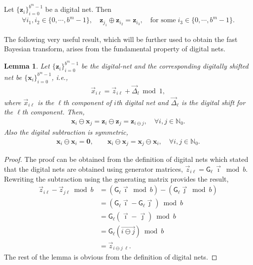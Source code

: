 \documentclass{iitthesis}          %
\newcommand{\bm}[1]{\boldsymbol{#1}}
\newcommand{\naturals}{\mathbb{N}}
\newcommand{\vx}{\bm{x}}
\newcommand{\vz}{\bm{z}}
\newcommand{\mG}{\mathsf{G}}
\newtheorem{lemma}[theorem]{Lemma}
\begin{document}
Let $\{\vz_i\}_{i=0}^{b^m-1}$ be a digital net. Then
\begin{align*}
\forall i_1, i_2 \in \{0,\cdots,b^m-1\}, \quad \vz_{j_1} \oplus \vz_{i_2} = \vz_{i_3}, \quad \text{for some} \; i_3 \in \{0,\cdots,b^m-1\}.
\end{align*}

The following very useful result, which will be further used to obtain the fast Bayesian transform, arises from the fundamental property of digital nets.

\begin{lemma}
\label{lemma:digital_net_prop}
Let $\{\vz_i\}_{i=0}^{b^{m}-1}$ be the digital-net and the corresponding digitally shifted net be $\{\vx_i\}_{i=0}^{b^{m}-1}$, i.e.,
\begin{align*}
\vec{x}_{i \ell} = \vec{z}_{i \ell} + \vec{\Delta}_l \bmod 1,
\end{align*}
where $\vec{x}_{i \ell}$ is the $\ell$th component of $i$th digital net and $\vec{\Delta}_{\ell}$ is the digital shift for the $\ell$th component. 
Then,
\begin{align}
\label{eqn:digital_shift_prop}
\vx_i \ominus \vx_j = \vz_i \ominus \vz_j = \vz_{i \ominus j}, \quad \forall i,j \in \naturals_0. 
\end{align}
 Also the digital subtraction is symmetric,
\begin{align}
\label{eqn:digital_net_symmetric_prop}
\vx_i \ominus \vx_i = \boldsymbol{ 0}, \qquad 
\vx_i \ominus \vx_j = \vx_j \ominus \vx_i, \quad \forall i,j \in \naturals_0.
\end{align}
\end{lemma}

\begin{proof}

The proof can be obtained from the definition of digital nets which stated that the digital nets are obtained using generator matrices, $\vec{z}_{i \ell} = \mG_{\ell} \, \vec{\imath} \bmod b$. Rewriting the subtraction using the generating matrix provides the result,
\begin{align*}
\vec{z}_{i \ell} - \vec{z}_{j\ell} \bmod b & = (\mG_{\ell} \vec{\imath} \bmod b) - (\mG_{\ell} \vec{\jmath} \bmod b) \\
& = (\mG_{\ell} \vec{\imath} - \mG_{\ell} \vec{\jmath} ) \bmod b \\
& = \mG_{\ell} (\vec{\imath} - \vec{\jmath} ) \bmod b \\
& = \mG_{\ell} (\overrightarrow{i \ominus j} ) \bmod b \\
& = \vec{z}_{i \ominus j \; {\ell}}.
\end{align*}
The rest of the lemma is obvious from the definition of digital nets.
\end{proof}
\end{document}
